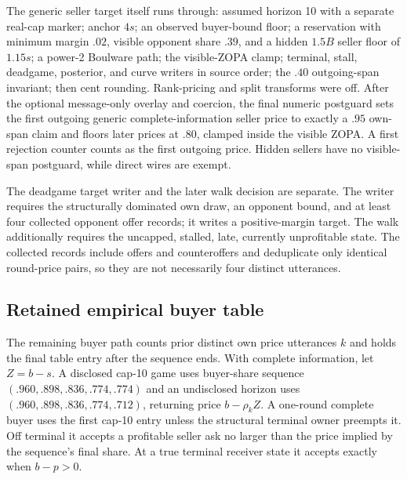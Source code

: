 The generic seller target itself runs through: assumed horizon 10 with a
separate real-cap marker; anchor $4s$; an observed buyer-bound floor; a
reservation with minimum margin $.02$, visible opponent share $.39$, and a
hidden $1.5B$ seller floor of $1.15s$; a power-2 Boulware path; the visible-ZOPA
clamp; terminal, stall, deadgame, posterior, and curve writers in source order;
the $.40$ outgoing-span invariant; then cent rounding. Rank-pricing and split
transforms were off. After the optional message-only overlay and coercion, the
final numeric postguard sets the first outgoing generic complete-information
seller price to exactly a $.95$ own-span claim and floors later prices at $.80$,
clamped inside the visible ZOPA. A first rejection counter counts as the first
outgoing price. Hidden sellers have no visible-span postguard, while direct
wires are exempt.

The deadgame target writer and the later walk decision are separate. The writer
requires the structurally dominated own draw, an opponent bound, and at least
four collected opponent offer records; it writes a positive-margin target. The
walk additionally requires the uncapped, stalled, late, currently unprofitable
state. The collected records include offers and counteroffers and deduplicate
only identical round-price pairs, so they are not necessarily four distinct
utterances.

\subsection{Retained empirical buyer table}

The remaining buyer path counts prior distinct own price utterances $k$ and
holds the final table entry after the sequence ends. With complete information,
let $Z=b-s$. A disclosed cap-10 game uses buyer-share sequence
$(.960,.898,.836,.774,.774)$ and an undisclosed horizon uses
$(.960,.898,.836,.774,.712)$, returning price $b-\rho_k Z$. A one-round
complete buyer uses the first cap-10 entry unless the structural terminal owner
preempts it. Off terminal it accepts a profitable seller ask no larger than the
price implied by the sequence's final share. At a true terminal receiver state
it accepts exactly when $b-p>0$.

